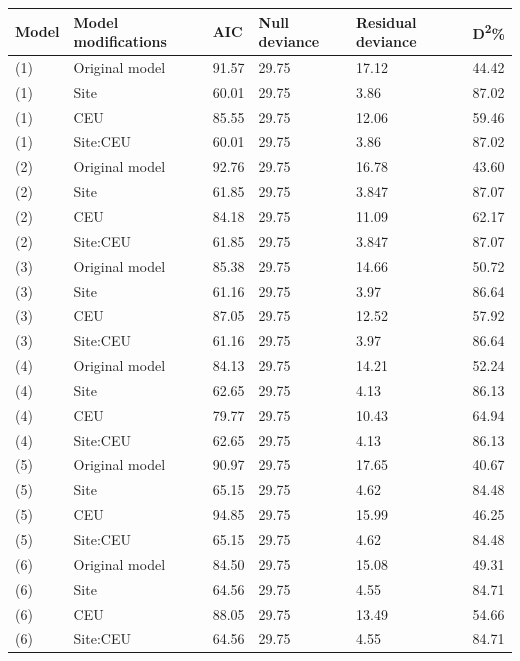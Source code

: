 \documentclass[review, authoryear]{elsarticle}   	%
\begin{document}
\begin{table}[htbp]
   \centering
   \begin{tabular}{p{2cm}p{4cm}p{2cm}p{2cm}p{2cm}p{2cm}}%
      \toprule
       Model  & Model modifications & AIC & Null deviance &Residual deviance & D\textsuperscript{2}\%\\
      \midrule
     (1) & Original model & 91.57& 29.75& 17.12 & 44.42\\
     (1) & Site & 60.01 & 29.75 & 3.86 & 87.02 \\
     (1) & CEU & 85.55 & 29.75 &12.06& 59.46 \\
     (1) & Site:CEU & 60.01 & 29.75 & 3.86 & 87.02 \\     
     (2) & Original model & 92.76 & 29.75 & 16.78 & 43.60 \\
     (2) & Site & 61.85 & 29.75 & 3.847 & 87.07\\
     (2) & CEU & 84.18 & 29.75 & 11.09 & 62.17 \\
     (2) & Site:CEU & 61.85 & 29.75 & 3.847 & 87.07 \\          
     (3) & Original model & 85.38 & 29.75 & 14.66 & 50.72 \\
     (3) & Site & 61.16 & 29.75 & 3.97 & 86.64 \\     
     (3) & CEU & 87.05& 29.75 & 12.52 & 57.92 \\     
     (3) & Site:CEU &61.16 & 29.75 & 3.97 & 86.64 \\          
     (4) & Original model & 84.13 & 29.75 & 14.21 & 52.24 \\
     (4) & Site & 62.65& 29.75 & 4.13 & 86.13\\
     (4) & CEU & 79.77 & 29.75 & 10.43 & 64.94 \\
     (4) & Site:CEU & 62.65& 29.75 & 4.13 & 86.13 \\
     (5) & Original model & 90.97 & 29.75 & 17.65 & 40.67 \\
     (5) & Site & 65.15 & 29.75 & 4.62 & 84.48 \\
     (5) & CEU & 94.85 & 29.75 & 15.99 & 46.25 \\
     (5) & Site:CEU & 65.15 & 29.75 & 4.62 & 84.48 \\
     (6) & Original model & 84.50 & 29.75 & 15.08 & 49.31 \\
     (6) & Site & 64.56 & 29.75 & 4.55 & 84.71 \\
     (6) & CEU & 88.05 & 29.75 & 13.49 & 54.66 \\
     (6) & Site:CEU &  64.56 & 29.75 & 4.55 & 84.71 \\
           \bottomrule
  \end{tabular}
   \label{tab:multilevel}
\end{table}
\end{document}
